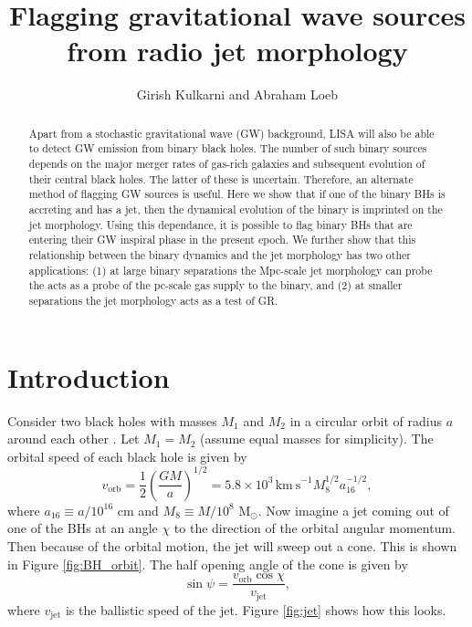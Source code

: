 \documentclass[iop]{emulateapj}
\begin{document}
\title{Flagging gravitational wave sources from radio jet morphology}
\author{Girish Kulkarni and
  Abraham Loeb}

\begin{abstract}
Apart from a stochastic gravitational wave (GW) background, LISA will
also be able to detect GW emission from binary black holes. The number
of such binary sources depends on the major merger rates of gas-rich
galaxies and subsequent evolution of their central black holes.  The
latter of these is uncertain.  Therefore, an alternate method of
flagging GW sources is useful.  Here we show that if one of the binary
BHs is accreting and has a jet, then the dynamical evolution of the
binary is imprinted on the jet morphology.  Using this dependance, it
is possible to flag binary BHs that are entering their GW inspiral
phase in the present epoch.  We further show that this relationship
between the binary dynamics and the jet morphology has two other
applications: (1) at large binary separations the Mpc-scale jet
morphology can probe the acts as a probe of the pc-scale gas supply to
the binary, and (2) at smaller separations the jet morphology acts as
a test of GR.
\end{abstract}


\section{Introduction}
\label{sec:intro}

Consider two black holes with masses $M_1$ and $M_2$ in a circular
orbit of radius $a$ around each other \citep{2010PhRvD..81d7503L}.
Let $M_1=M_2$ (assume equal masses for simplicity).  The orbital speed
of each black hole is given by
\begin{equation}
  v_\mathrm{orb} = \frac{1}{2}\left(\frac{GM}{a}\right)^{1/2} = 5.8\times 10^3\, \mathrm{km~s}^{-1}M_8^{1/2}a_{16}^{-1/2},
  \label{eqn:vorb}
\end{equation}
where $a_{16}\equiv a/10^{16}$ cm and $M_8\equiv M/10^8$
M$_\odot$. Now imagine a jet coming out of one of the BHs at an angle
$\chi$ to the direction of the orbital angular momentum.  Then because
of the orbital motion, the jet will sweep out a cone.  This is shown
in Figure \ref{fig:BH_orbit}.  The half opening angle of the cone is
given by
\begin{equation}
  \sin\psi = \frac{v_\mathrm{orb}\cos\chi}{v_\mathrm{jet}},
\end{equation}
where $v_\mathrm{jet}$ is the ballistic speed of the jet.  Figure
\ref{fig:jet} shows how this looks.
\end{document}
